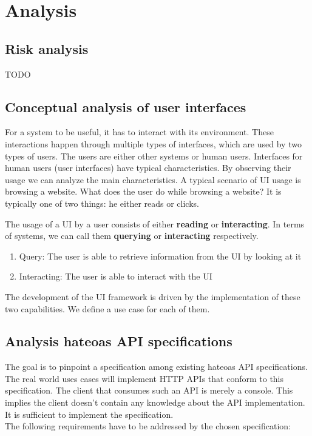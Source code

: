 \section{Analysis}
\subsection{Risk analysis}
TODO

\subsection{Conceptual analysis of user interfaces}
For a system to be useful, it has to interact with its environment. These interactions happen through multiple types of interfaces, which are used by two types of users. The users are either other systems or human users.
Interfaces for human users (user interfaces) have typical characteristics. By observing their usage we can analyze the main characteristics. A typical scenario of UI usage is browsing a website. What does the user do while browsing a website? It is typically one of two things: he either reads or clicks.

The usage of a UI by a user consists of either \textbf{reading} or \textbf{interacting}. In terms of systems, we can call them \textbf{querying} or \textbf{interacting} respectively.

\begin{enumerate}
  \item Query: The user is able to retrieve information from the UI by looking at it
  \item Interacting: The user is able to interact with the UI
\end{enumerate}

The development of the UI framework is driven by the implementation of these two capabilities. We define a use case for each of them.

\subsection{Analysis \gls{hateoas} API specifications}
The goal is to pinpoint a specification among existing \gls{hateoas} API specifications. The real world uses cases will implement HTTP APIs that conform to this specification. The client that consumes such an API is merely a console. This implies the client doesn't contain any knowledge about the API implementation. It is sufficient to implement the specification. \\
The following requirements have to be addressed by the chosen specification:

